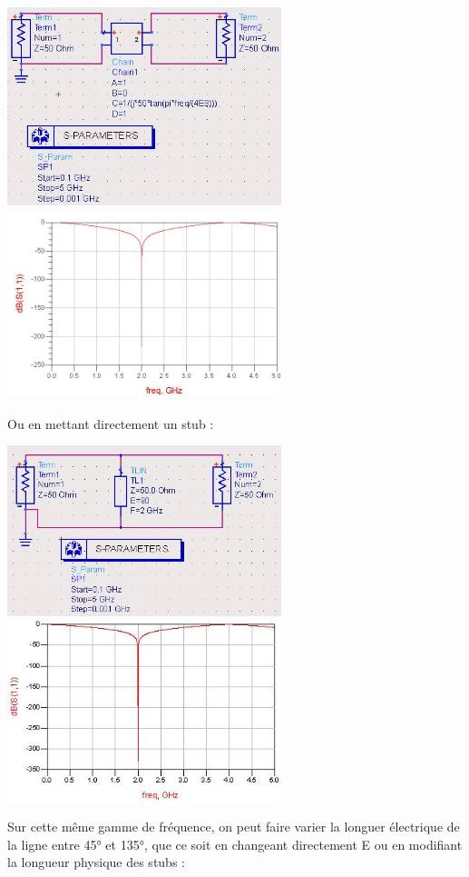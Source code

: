 \documentclass[10pt]{article}
\begin{document}
  \includegraphics[width=8cm]{I3_b_circ.jpg}
  \includegraphics[width=8cm]{I3_b_simu.jpg}

  Ou en mettant directement un stub :

  \includegraphics[width=8cm]{I3_b_circ_stub.jpg}
  \includegraphics[width=8cm]{I3_b_simu_stub.jpg}

  Sur cette même gamme de fréquence, on peut faire varier la longuer électrique de la ligne entre 45° et 135°, que ce soit en changeant directement E ou en modifiant la longueur physique des stubs :
\end{document}
